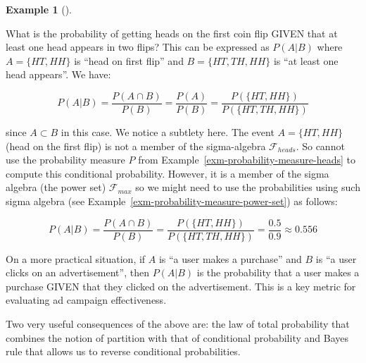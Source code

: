 \documentclass[
  letterpaper,
  DIV=11,
  numbers=noendperiod]{scrreport}
\theoremstyle{definition}
\newtheorem{example}{Example}[chapter]
\theoremstyle{plain}
\theoremstyle{definition}
\theoremstyle{plain}
\theoremstyle{remark}
\begin{document}
\begin{tcolorbox}[enhanced jigsaw, breakable, opacityback=0, leftrule=.75mm, colback=white, bottomtitle=1mm, coltitle=black, toptitle=1mm, titlerule=0mm, bottomrule=.15mm, colframe=quarto-callout-note-color-frame, title={Example of Conditional Probability}, opacitybacktitle=0.6, colbacktitle=quarto-callout-note-color!10!white, rightrule=.15mm, arc=.35mm, toprule=.15mm, left=2mm]

\begin{example}[]\protect\hypertarget{exm-cond-probability}{}\label{exm-cond-probability}

What is the probability of getting heads on the first coin flip GIVEN
that at least one head appears in two flips? This can be expressed as
\(P(A|B)\) where \(A=\{HT,HH\}\) is ``head on first flip'' and
\(B=\{HT,TH,HH\}\) is ``at least one head appears''. We have:

\[
P(A|B) = \frac{P(A \cap B)}{P(B)} =\frac{P(A)}{P(B)}= \frac{P(\{HT,HH\})}{P(\{HT,TH,HH\})} 
\]

since \(A\subset B\) in this case. We notice a subtlety here. The event
\(A =\{HT,HH\}\) (head on the first flip) is not a member of the
sigma-algebra \(\mathcal F_{heads}\). So cannot use the probability
measure \(P\) from Example~\ref{exm-probability-measure-heads} to
compute this conditional probability. However, it is a member of the
sigma algebra (the power set) \(\mathcal F_{max}\) so we might need to
use the probabilities using such sigma algebra (see
Example~\ref{exm-probability-measure-power-set}) as follows:

\[
P(A|B) = \frac{P(A \cap B)}{P(B)} = \frac{P(\{HT,HH\})}{P(\{HT,TH,HH\})} = 
 \frac{0.5}{0.9} \approx 0.556
\]

On a more practical situation, if \(A\) is ``a user makes a purchase''
and \(B\) is ``a user clicks on an advertisement'', then \(P(A|B)\) is
the probability that a user makes a purchase GIVEN that they clicked on
the advertisement. This is a key metric for evaluating ad campaign
effectiveness.

\end{example}

\end{tcolorbox}

Two very useful consequences of the above are: the law of total
probability that combines the notion of partition with that of
conditional probability and Bayes rule that allows us to reverse
conditional probabilities.
\end{document}
